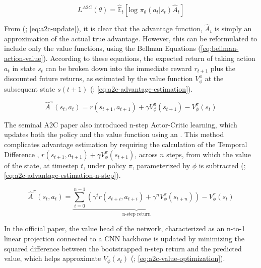             \begin{equation}
                L^{A2C}(\theta) = \mathbb{\hat{E}}_{t} \left [ \text{log } \pi_{\theta}(a_t | s_t) \hat{A}_t \right]
                \label{eq:a2c-update}
            \end{equation}
            
            \noindent From (\textcolor{deepblue}{\cite{mnih2016asynchronous}; \autoref{eq:a2c-update}}), it is clear that the advantage function, $\hat{A}_t$ is simply an approximation of the actual true advantage. However, this can be reformulated to include only the value functions, using the Bellman Equations (\textcolor{deepblue}{\autoref{eq:bellman-action-value}}). According to these equations, the expected return of taking action $a_t$ in state $s_t$ can be broken down into the immediate reward $r_{t+1}$ plus the discounted future returns, as estimated by the value function $V^{\pi}_{\phi}$ at the subsequent state $s(t+1)$ (\textcolor{deepblue}{\cite{mnih2016asynchronous}; \autoref{eq:a2c-advantage-estimation}}). 
            
            \begin{equation}
                \hat{A}^{\pi}(s_t, a_t) = r(s_{t+1}, a_{t+1}) + \gamma V^{\pi}_{\phi}(s_{t+1}) - V^{\pi}_{\phi}(s_{t})
                \label{eq:a2c-advantage-estimation}
            \end{equation}
            
            \noindent The seminal A2C paper also introduced n-step Actor-Critic learning, which updates both the policy and the value function using an . This method complicates advantage estimation by requiring the calculation of the Temporal Difference , $r(s_{t+1}, a_{t+1}) + \gamma V^{\pi}_{\phi}(s_{t+1})$, across $n$ steps, from which the value of the state, at timestep $t$, under policy $\pi$, parameterized by $\phi$ is subtracted (\textcolor{deepblue}{\cite{mnih2016asynchronous}; \autoref{eq:a2c-advantage-estimation-n-step}}).
            
            \begin{equation}
                \hat{A}^{\pi}(s_t, a_t) = \underbrace{{\sum_{i=0}^{n-1}} \left (\gamma^i r(s_{t+i}, a_{t+i}) + \gamma^n V^{\pi}_{\phi}(s_{t+n}) \right )}_{\text{n-step return}} - V^{\pi}_{\phi}(s_{t})
                \label{eq:a2c-advantage-estimation-n-step}
            \end{equation}
            
            \noindent In the official paper, the value head of the network, characterized as an n-to-1 linear projection connected to a CNN backbone is updated by minimizing the squared difference between the bootstrapped n-step return and the predicted value, which helps approximate $V_{\phi}(s_t)$ (\textcolor{deepblue}{\cite{mnih2016asynchronous}; \autoref{eq:a2c-value-optimization}}).
            
